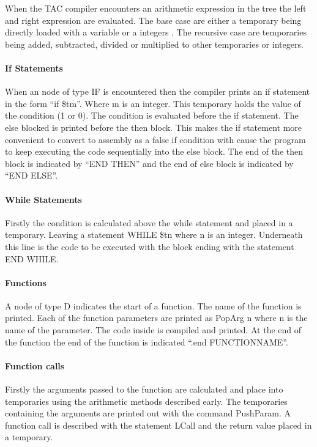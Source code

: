 \documentclass{article}
\begin{document}
	When the TAC compiler encounters an arithmetic expression in the tree the left and right expression are evaluated. The base case are either a temporary being directly loaded with a variable or a integers . The recursive case are temporaries being added, subtracted, divided or multiplied to other temporaries or integers. 
	
	\paragraph{If Statements}
	
	When an node of type IF is encountered then the compiler prints an if statement in the form “if \$tm”. Where m is an integer. This temporary holds the value of the condition (1 or 0). The condition is evaluated before the if statement. The else blocked is printed before the then block. This makes the if statement more convenient to convert to assembly as a false if condition with cause the program to keep executing the code sequentially into the else block. The end of the then block is indicated by “END THEN” and the end of else block is indicated by “END ELSE”.
	
	\paragraph{While Statements} 
	
	Firstly the condition is calculated above the while statement and placed in a temporary. Leaving a statement WHILE \$tn where n is an integer. Underneath this line is the code to be executed with the block ending with the statement END WHILE. 
	
	\paragraph{Functions}
	
	A node of type D indicates the start of a function. The name of the function is printed. Each of the function parameters are printed as PopArg n where n is the name of the parameter. The code inside is compiled and printed. At the end of the function the end of the function is indicated “.end FUNCTIONNAME”.
	
	\paragraph{Function calls}
	
	Firstly the arguments passed to the function are calculated and place into temporaries using the arithmetic methods described early. The temporaries containing the arguments are printed out with the command PushParam. A function call is described with the statement LCall and the return value placed in a temporary.  
	
\end{document}
